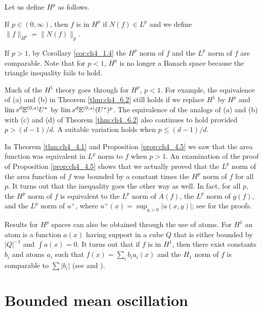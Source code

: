 
Let us define $H^p$ as follows.

\begin{definition}\label{def:ch4_6.12}
If $p \in (0,\infty)$, then $f$ is in $H^p$ if $N(f) \in L^p$ and we define $\|f\|_{H^p} = \|N(f)\|_p$.
\end{definition}

If $p > 1$, by Corollary \ref{cor:ch4_1.4} the $H^p$ norm of $f$ and the $L^p$ norm of $f$ are comparable. Note that for $p < 1$, $H^p$ is no longer a Banach space because the triangle inequality fails to hold.

Much of the $H^1$ theory goes through for $H^p$, $p < 1$. For example, the equivalence of (a) and (b) in Theorem \ref{thm:ch4_6.2} still holds if we replace $H^1$ by $H^p$ and $\lim s^d\mathbb{E}^{(0,s)}U^*$ by $\lim s^d\mathbb{E}^{(0,s)}(U^*)^p$. The equivalence of the analogs of (a) and (b) with (c) and (d) of Theorem \ref{thm:ch4_6.2} also continues to hold provided $p > (d-1)/d$. A suitable variation holds when $p \leq (d-1)/d$.

In Theorem \ref{thm:ch4_4.1} and Proposition \ref{prop:ch4_4.5} we saw that the area function was equivalent in $L^p$ norm to $f$ when $p > 1$. An examination of the proof of Proposition \ref{prop:ch4_4.5} shows that we actually proved that the $L^p$ norm of the area function of $f$ was bounded by a constant times the $H^p$ norm of $f$ for all $p$. It turns out that the inequality goes the other way as well. In fact, for all $p$, the $H^p$ norm of $f$ is equivalent to the $L^p$ norm of $A(f)$, the $L^p$ norm of $g(f)$, and the $L^p$ norm of $u^+$, where $u^+(x) = \sup_{y>0}|u(x,y)|$; see \cite{FeffermanStein1972} for the proofs.

Results for $H^p$ spaces can also be obtained through the use of atoms. For $H^1$ an atom is a function $a(x)$ having support in a cube $Q$ that is either bounded by $|Q|^{-1}$ and $\int a(x)=0$. It turns out that if $f$ is in $H^1$, then there exist constants $b_i$ and atoms $a_i$ such that $f(x)=\sum_i b_i a_i(x)$ and the $H_1$ norm of $f$ is comparable to $\sum|b_i|$ (see \cite{Coifman1974} and \cite{Latter1978}).

\section{Bounded mean oscillation}\label{ch4_sec7}


